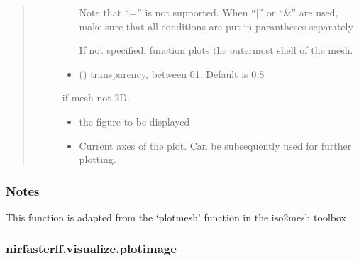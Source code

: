 \documentclass[letterpaper,10pt,english]{sphinxmanual}
\begin{document}
\begin{fulllineitems}
\begin{quote}
\begin{description}
\begin{itemize}
\sphinxAtStartPar
Note that “=” is not supported. When “|” or “\&” are used, make sure that all conditions are put in parantheses separately

\sphinxAtStartPar
If not specified, function plots the outermost shell of the mesh.


\item {} 
\sphinxAtStartPar
{} (\sphinxstyleliteralemphasis{\sphinxupquote{, }}) \textendash{} transparency, between 0\sphinxhyphen{}1. Default is 0.8

\end{itemize}

\sphinxAtStartPar
{} \textendash{} if mesh not 2D.

\sphinxAtStartPar
\begin{itemize}
\item {} 
\sphinxAtStartPar
{} \textendash{} the figure to be displayed

\item {} 
\sphinxAtStartPar
{} \textendash{} Current axes of the plot. Can be subsequently used for further plotting.

\end{itemize}


\end{description}\end{quote}
\subsubsection*{Notes}

\sphinxAtStartPar
This function is adapted from the ‘plotmesh’ function in the iso2mesh toolbox

\sphinxAtStartPar
{}

\end{fulllineitems}


\sphinxstepscope


\subsubsection{nirfasterff.visualize.plotimage}
\label{\detokenize{_autosummary/nirfasterff.visualize.plotimage:nirfasterff-visualize-plotimage}}\label{\detokenize{_autosummary/nirfasterff.visualize.plotimage::doc}}
\end{document}
